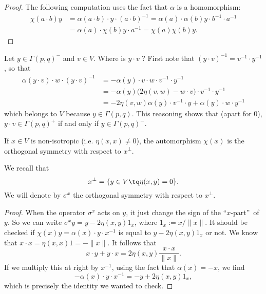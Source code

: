 \begin{proof}
The following computation uses the fact that $\alpha$ is a homomorphism:
\[
\begin{split}
\chi(a\cdot b)y&=\alpha(a\cdot b)\cdot y\cdot (a\cdot b)^{-1}
               =\alpha(a)\cdot\alpha(b)y\cdot b^{-1}\cdot a^{-1}\\
               &=\alpha(a)\cdot\chi(b)y\cdot a^{-1}
               =\chi(a)\chi(b)y.
\end{split}
\]
\end{proof}
Let $y\in\Gamma(p,q)^-$ and $v\in V$. Where is $y\cdot v$ ? First note that $(y\cdot v)^{-1}=v^{-1}\cdot y^{-1}$, so that
\begin{equation}
\begin{split}
  \alpha(y\cdot v)\cdot w\cdot(y\cdot v)^{-1}&=-\alpha(y)\cdot v\cdot w\cdot v^{-1}\cdot y^{-1}\\
                                            &=-\alpha(y)\big( 2\eta(v,w)-w\cdot v \big)\cdot v^{-1}\cdot y^{-1}\\
					    &=-2\eta(v,w)\alpha(y)\cdot v^{-1}\cdot y+\alpha(y)\cdot w\cdot y^{-1}
\end{split}
\end{equation}
which belongs to $V$ because $y\in\Gamma(p,q)$. This reasoning shows that (apart for $0$), $y\cdot v\in\Gamma(p,q)^+$ if and only if $y\in\Gamma(p,q)^-$.

\begin{lemma}
If $x\in V$ is non-isotropic (i.e. $\eta(x,x)\neq 0$), the automorphism $\chi(x)$  is the orthogonal symmetry with respect to $x^{\perp}$.
\end{lemma}

We recall that
\[ 
  x^{\perp}=\{ y\in V\tq\eta(x,y)=0  \}.
\]
We will denote by $\sigma^x$ the orthogonal symmetry with respect to $x^{\perp}$.

\begin{proof}
When the operator $\sigma^x$ acts on $y$, it just change the sign of the ``$x$-part''\ of $y$. So we can write $\sigma^x y=y-2\eta(x,y) 1_x$, where $1_x:=x/\|x\|$. It should be checked if
$\chi(x)y=\alpha(x)\cdot y\cdot x^{-1}$ is equal to $y-2\eta(x,y) 1_x$ or not. We know that $x\cdot x=\eta(x,x)1=-\|x\|$. It follows that
\[
  x\cdot y+y\cdot x=2\eta(x,y)\frac{x\cdot x}{\|x\|}.
  \]
If we multiply this at right by $x^{-1}$, using the fact that $\alpha(x)=-x$, we find
\[
-\alpha(x)\cdot y\cdot x^{-1}=-y+2\eta(x,y) 1_x,
\]
which is precisely the identity we wanted to check.
\end{proof}

